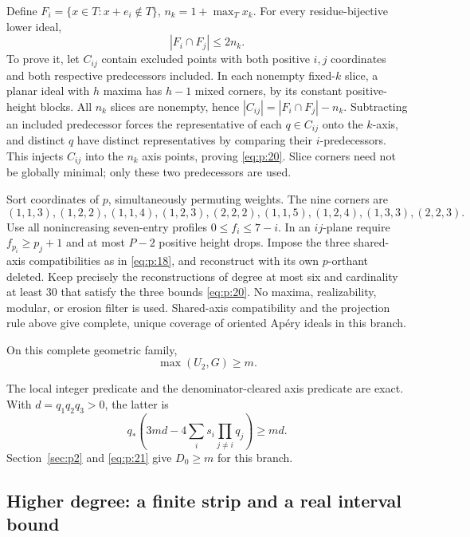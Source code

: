 Define \(F_i=\{x\in T:x+e_i\notin T\}\), \(n_k=1+\max_Tx_k\).
For every residue-bijective lower ideal,
\begin{equation}
|F_i\cap F_j|\le2n_k.
\label{eq:p:20}
\end{equation}
To prove it, let \(C_{ij}\) contain excluded points with both positive
\(i,j\) coordinates and both respective predecessors included.
In each nonempty fixed-\(k\) slice, a planar ideal with \(h\) maxima has
\(h-1\) mixed corners, by its constant positive-height blocks.
All \(n_k\) slices are nonempty, hence
\(|C_{ij}|=|F_i\cap F_j|-n_k\).
Subtracting an included predecessor forces the representative of
each \(q\in C_{ij}\) onto the \(k\)-axis, and distinct \(q\) have distinct
representatives by comparing their \(i\)-predecessors.
This injects \(C_{ij}\) into the \(n_k\) axis points, proving \eqref{eq:p:20}.
Slice corners need not be globally minimal; only these two predecessors are used.

Sort coordinates of \(p\), simultaneously permuting weights.
The nine corners are
\[
(1,1,3),(1,2,2),(1,1,4),(1,2,3),(2,2,2),
(1,1,5),(1,2,4),(1,3,3),(2,2,3).
\]
Use all nonincreasing seven-entry profiles \(0\le f_i\le7-i\).
In an \(ij\)-plane require \(f_{p_i}\ge p_j+1\) and at most \(P-2\)
positive height drops. Impose the three shared-axis compatibilities
as in \eqref{eq:p:18}, and reconstruct with its own \(p\)-orthant deleted.
Keep precisely the reconstructions of degree at most six and cardinality at
least 30 that satisfy the three bounds \eqref{eq:p:20}. No maxima,
realizability, modular, or erosion filter is used.
Shared-axis compatibility and the projection rule above give complete,
unique coverage of oriented Ap\'ery ideals in this branch.

\begin{finitelemma}\label{finite:degree-six}
On this complete geometric family,
\begin{equation}
\max(U_2,G)\ge m.
\label{eq:p:21}
\end{equation}

\end{finitelemma}

The local integer predicate and the denominator-cleared axis predicate
are exact. With \(d=q_1q_2q_3>0\), the latter is
\[
q_*\left(3md-4\sum_i s_i\prod_{j\ne i}q_j\right)\ge md.
\]
Section~\ref{sec:p2} and \eqref{eq:p:21} give \(D_0\ge m\) for this branch.

\subsection{Higher degree: a finite strip and a real interval bound}\label{sec:p11}

